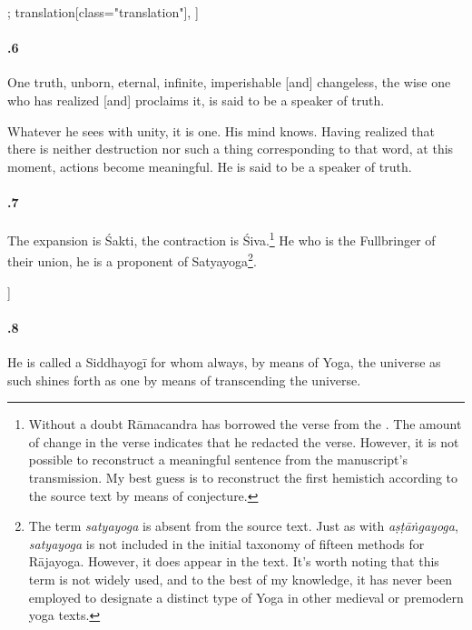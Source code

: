 \begin{alignment}[
  texts=edition[class="edition"];
  translation[class="translation"],
  ]
\begin{translation}
\begin{tlate}[44_6]
      \paragraph{.6} One truth, unborn, eternal, infinite, imperishable [and] changeless, the wise one who has realized [and] proclaims it, is said to be a speaker of truth. \\
    \end{tlate}
    \begin{tlate}[p44_03]
      Whatever he sees with unity, it is one. His mind knows. Having realized that there is neither destruction nor such a thing corresponding to that word, at this moment, actions become meaningful. He is said to be a speaker of truth.
    \end{tlate}
    \begin{tlate}[44_7]
      \paragraph{.7} The expansion is Śakti, the contraction is Śiva.\footnote{Without a doubt Rāmacandra has borrowed the verse from the . The amount of change in the verse indicates that he redacted the verse. However, it is not possible to reconstruct a meaningful sentence from the manuscript's transmission. My best guess is to reconstruct the first hemistich according to the source text by means of conjecture.} He who is the Fullbringer of their union, he is a proponent of Satyayoga\footnote{The term \textit{satyayoga} is absent from the source text. Just as with \textit{aṣṭāṅgayoga}, \textit{satyayoga} is not included in the initial taxonomy of fifteen methods for Rājayoga. However, it does appear in the text. It's worth noting that this term is not widely used, and to the best of my knowledge, it has never been employed to designate a distinct type of Yoga in other medieval or premodern yoga texts.}.
    \end{tlate}
    \begin{tlate}[44_8]]
      \paragraph{.8} He is called a Siddhayogī for whom always, by means of Yoga, the universe as such shines forth as one by means of transcending the universe.
    \end{tlate}
    \begin{tlate}[44_9]

\end{tlate}
\end{translation}
\end{alignment}
